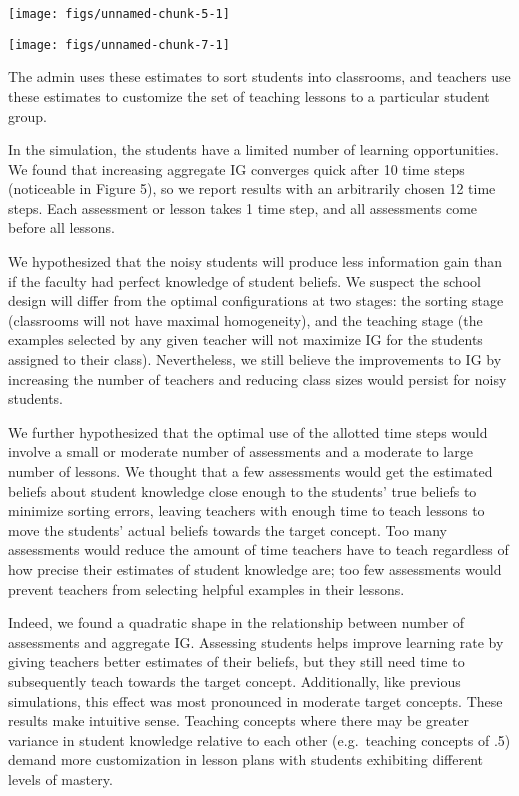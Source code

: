 \documentclass[10pt, letterpaper]{article}
\newenvironment{CodeChunk}{}{}
\begin{document}
\begin{CodeChunk}

\texttt{[image: figs/unnamed-chunk-5-1]} \end{CodeChunk}

\begin{CodeChunk}

\texttt{[image: figs/unnamed-chunk-7-1]} \end{CodeChunk}

The admin uses these estimates to sort students into classrooms, and
teachers use these estimates to customize the set of teaching lessons to
a particular student group.

In the simulation, the students have a limited number of learning
opportunities. We found that increasing aggregate IG converges quick
after 10 time steps (noticeable in Figure 5), so we report results with
an arbitrarily chosen 12 time steps. Each assessment or lesson takes 1
time step, and all assessments come before all lessons.

We hypothesized that the noisy students will produce less information
gain than if the faculty had perfect knowledge of student beliefs. We
suspect the school design will differ from the optimal configurations at
two stages: the sorting stage (classrooms will not have maximal
homogeneity), and the teaching stage (the examples selected by any given
teacher will not maximize IG for the students assigned to their class).
Nevertheless, we still believe the improvements to IG by increasing the
number of teachers and reducing class sizes would persist for noisy
students.

We further hypothesized that the optimal use of the allotted time steps
would involve a small or moderate number of assessments and a moderate
to large number of lessons. We thought that a few assessments would get
the estimated beliefs about student knowledge close enough to the
students' true beliefs to minimize sorting errors, leaving teachers with
enough time to teach lessons to move the students' actual beliefs
towards the target concept. Too many assessments would reduce the amount
of time teachers have to teach regardless of how precise their estimates
of student knowledge are; too few assessments would prevent teachers
from selecting helpful examples in their lessons.

Indeed, we found a quadratic shape in the relationship between number of
assessments and aggregate IG. Assessing students helps improve learning
rate by giving teachers better estimates of their beliefs, but they
still need time to subsequently teach towards the target concept.
Additionally, like previous simulations, this effect was most pronounced
in moderate target concepts. These results make intuitive sense.
Teaching concepts where there may be greater variance in student
knowledge relative to each other (e.g.~teaching concepts of .5) demand
more customization in lesson plans with students exhibiting different
levels of mastery.
\end{document}
